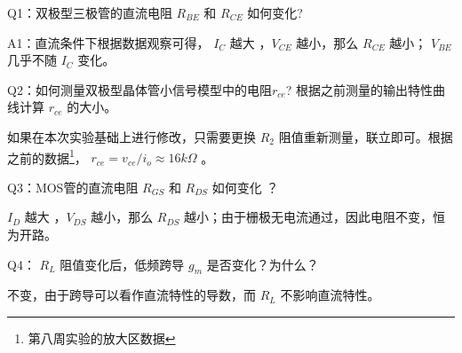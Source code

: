 \documentclass[lang=cn,11pt,a4paper,cite=authoryear]{elegantpaper}
\begin{document}
Q1：双极型三极管的直流电阻 \(R_{BE}\) 和 \(R_{CE}\) 如何变化?

A1：直流条件下根据数据观察可得， \(I_C\) 越大 ，\(V_{CE}\) 越小，那么 \(R_{CE}\) 越小； \(V_{BE}\) 几乎不随 \(I_C\) 变化。

Q2：如何测量双极型晶体管小信号模型中的电阻\(r_{ce}\)?
根据之前测量的输出特性曲线计算 \(r_{ce}\) 的大小。

如果在本次实验基础上进行修改，只需要更换 \(R_2\) 阻值重新测量，联立即可。根据之前的数据\footnote{第八周实验的放大区数据}， \(r_{ce} = v_{ce} / i_o \approx 16 k\Omega\) 。

Q3：MOS管的直流电阻 \(R_{GS}\) 和 \(R_{DS}\) 如何变化 ？

\(I_D\) 越大 ，\(V_{DS}\) 越小，那么 \(R_{DS}\) 越小；由于栅极无电流通过，因此电阻不变，恒为开路。

Q4： \(R_L\) 阻值变化后，低频跨导 \(g_m\) 是否变化？为什么？

不变，由于跨导可以看作直流特性的导数，而 \(R_L\) 不影响直流特性。


\end{document}
